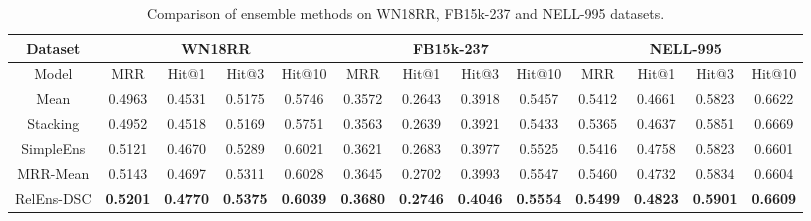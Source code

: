 \documentclass[11pt,a4paper]{article}
\begin{document}
  \begin{table*}[ht]
      \centering
      \caption{Comparison of ensemble methods on WN18RR, FB15k-237 and NELL-995 datasets.}
\small
      \setlength\tabcolsep{3.8pt}
      \begin{tabular}{c|cccc|cccc|cccc}
          \toprule
          Dataset      & \multicolumn{4}{c|}{WN18RR} & \multicolumn{4}{c|}{FB15k-237} & \multicolumn{4}{c}{NELL-995}                                                                                                                                                                   \\ \midrule
          Model        & MRR                         & Hit@1                          & Hit@3                        & Hit@10          & MRR             & Hit@1           & Hit@3           & Hit@10          & MRR             & Hit@1           & Hit@3           & Hit@10          \\ \midrule
          Mean         & 0.4963                    & 0.4531                       & 0.5175                       & 0.5746          & 0.3572           & 0.2643          & 0.3918          & 0.5457          & 0.5412           & 0.4661           & 0.5823          & 0.6622          \\
          Stacking     & 0.4952                    & 0.4518                      & 0.5169                       & 0.5751          & 0.3563          & 0.2639          & 0.3921          & 0.5433          & 0.5365          & 0.4637          & 0.5851          & 0.6669          \\
          SimpleEns    & 0.5121                & 0.4670                        & 0.5289                     & 0.6021          & 0.3621          & 0.2683          & 0.3977          & 0.5525          & 0.5416          & 0.4758          & 0.5823          & 0.6601          \\
          MRR-Mean    & 0.5143                & 0.4697                        & 0.5311                     & 0.6028          & 0.3645          & 0.2702          & 0.3993          & 0.5547          & 0.5460          & 0.4732          & 0.5834          & 0.6604          \\
          RelEns-DSC & \textbf{0.5201}   & \textbf{0.4770}  & \textbf{0.5375}  & \textbf{0.6039} & \textbf{0.3680} & \textbf{0.2746} & \textbf{0.4046} & \textbf{0.5554} & \textbf{0.5499} & \textbf{0.4823} & \textbf{0.5901} & \textbf{0.6609} \\ \bottomrule
      \end{tabular}
      \label{tab:ensemble2}
  \end{table*}
  
  
\end{document}
